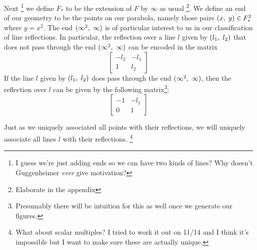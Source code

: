\documentclass[12pt]{article}
\newcommand{\ttc}{, \hspace{1mm}}
\newcommand{\linenoendmat}[2]{\begin{bmatrix} -{#2} & -{#1} \\ 1 & {#2} \end{bmatrix}}
\newcommand{\stanlinenoendmat}{\linenoendmat{l_1}{l_2}}
\newcommand{\lineendmat}[2]{\begin{bmatrix} -1 & -{#1} \\ 0 & 1 \end{bmatrix}}
\newcommand{\stanlineendmat}{\lineendmat{l_1}{l_2}}
\newcommand{\specialend}{(\infty^2\ttc\infty)}
\theoremstyle{plain}
\theoremstyle{definition}
\begin{document}
Next \footnote{I guess we're just adding ends so we can have two kinds of lines? Why doesn't Guggenheimer \textit{ever} give motivation?} we define $F_*$ to be the extension of $F$ by $\infty$ as usual \footnote{Elaborate in the appendix}. We define an end of our geometry to be the points on our parabola, namely those pairs $(x \ttc y) \in F_*^2$ where $y = x^2$. The end $\specialend$ is of particular interest to us in our classification of line reflections. In particular, the reflection over a line $l$ given by $(l_1\ttc l_2)$ that does not pass through the end $\specialend$ can be encoded in the matrix
\[\stanlinenoendmat\]
If the line $l$ given by $(l_1\ttc l_2)$ does pass through the end $\specialend$, then the reflection over $l$ can be given by the following matrix\footnote{Presumably there will be intuition for this as well once we generate our figures.}:
\[
	\stanlineendmat
\]

Just as we uniquely associated all points with their reflections, we will uniquely associate all lines $l$ with their reflections. \footnote{What about scalar multiples? I tried to work it out on 11/14 and I think it's impossible  but I want to make sure these are actually unique.} 
\end{document}
